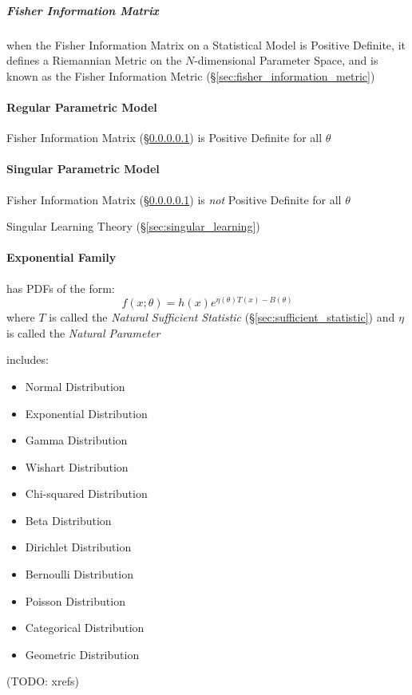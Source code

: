 \subparagraph{Fisher Information Matrix}\label{sec:fim}\hfill

when the Fisher Information Matrix on a Statistical Model is Positive Definite,
it defines a Riemannian Metric on the $N$-dimensional Parameter Space, and is
known as the Fisher Information Metric (\S\ref{sec:fisher_information_metric})



\paragraph{Regular Parametric Model}\label{sec:regular_model}\hfill

Fisher Information Matrix (\S\ref{sec:fim}) is Positive Definite for all
$\theta$



\paragraph{Singular Parametric Model}\label{sec:singular_model}\hfill

Fisher Information Matrix (\S\ref{sec:fim}) is \emph{not} Positive Definite for
all $\theta$

\fist Singular Learning Theory (\S\ref{sec:singular_learning})



\paragraph{Exponential Family}\label{sec:exponential_family}\hfill

has PDFs of the form:
\[
  f(x; \theta) = h(x) e^{\eta(\theta)T(x) - B(\theta)}
\]
where $T$ is called the \emph{Natural Sufficient Statistic}
(\S\ref{sec:sufficient_statistic}) and $\eta$ is called the \emph{Natural
  Parameter}

includes:
\begin{itemize}
  \item Normal Distribution
  \item Exponential Distribution
  \item Gamma Distribution
  \item Wishart Distribution
  \item Chi-squared Distribution
  \item Beta Distribution
  \item Dirichlet Distribution
  \item Bernoulli Distribution
  \item Poisson Distribution
  \item Categorical Distribution
  \item Geometric Distribution
\end{itemize}
(TODO: xrefs)

